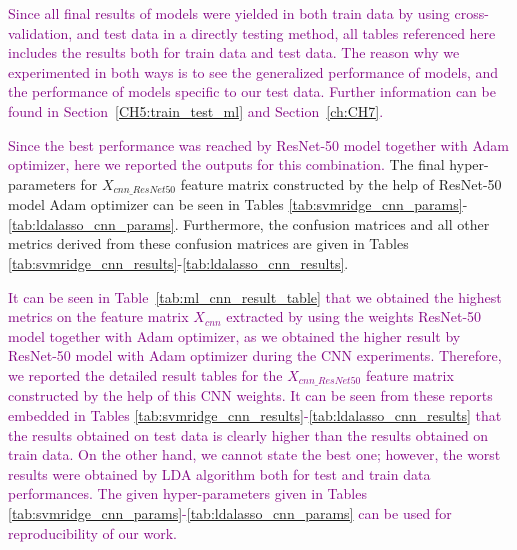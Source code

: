 \textcolor{purple}{Since all final results of models were yielded in both train data by using cross-validation, and test data in a directly testing method, all tables referenced here includes the results both for train data and test data. The reason why we experimented in both ways is to see the generalized performance of models, and the performance of models specific to our test data. Further information can be found in Section~\ref{CH5:train_test_ml} and Section~\ref{ch:CH7}.}

\textcolor{purple}{Since the best performance was reached by ResNet-50 model together with Adam optimizer, here we reported the outputs for this combination.} The final hyper-parameters for $X_{cnn\_ResNet50}$ feature matrix constructed by the help of ResNet-50 model Adam optimizer can be seen in Tables \ref{tab:svmridge_cnn_params}-\ref{tab:ldalasso_cnn_params}. Furthermore, the confusion matrices and all other metrics derived from these confusion matrices are given in Tables \ref{tab:svmridge_cnn_results}-\ref{tab:ldalasso_cnn_results}.

\textcolor{purple}{It can be seen in Table~\ref{tab:ml_cnn_result_table} that we obtained the highest metrics on the feature matrix $X_{cnn}$ extracted by using the weights ResNet-50 model together with Adam optimizer, as we obtained the higher result by ResNet-50 model with Adam optimizer during the CNN experiments. Therefore, we reported the detailed result tables for the $X_{cnn\_ResNet50}$ feature matrix constructed by the help of this CNN weights. It can be seen from these reports embedded in Tables \ref{tab:svmridge_cnn_results}-\ref{tab:ldalasso_cnn_results} that the results obtained on test data is clearly higher than the results obtained on train data. On the other hand, we cannot state the best one; however, the worst results were obtained by LDA algorithm both for test and train data performances. The given hyper-parameters given in Tables \ref{tab:svmridge_cnn_params}-\ref{tab:ldalasso_cnn_params} can be used for reproducibility of our work.}

